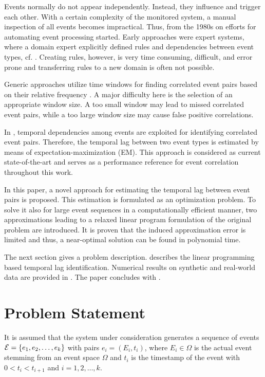 \documentclass[journal, 10pt]{IEEEtran}
\begin{document}
Events normally do not appear independently. Instead, they influence and trigger each other. With a certain complexity of the monitored system, a manual inspection of all events becomes impractical. Thus, from the 1980s on efforts for automating event processing started. Early approaches were expert systems, where a domain expert explicitly defined rules and dependencies between event types, cf. \cite{Houck1995, Kettschau2002}. 
Creating rules, however, is very time consuming, difficult, and error prone and transferring rules to a new domain is often not possible.

Generic approaches utilize time windows for finding correlated event pairs based on their relative frequency \cite{Jakobson1993, Mannila1997, Bouandas2007}. A major difficulty here is the selection of an appropriate window size. A too small window may lead to missed correlated event pairs, while a too large window size may cause false positive correlations. 

In \cite{Zeng2015}, temporal dependencies among events are exploited for identifying correlated event pairs. Therefore, the temporal lag between two event types is estimated by means of expectation-maximization (EM). This approach is considered as current state-of-the-art and serves as a performance reference for event correlation throughout this work.

In this paper, a novel approach for estimating the temporal lag between event pairs is proposed. This estimation is formulated as an optimization problem. To solve it also for large event sequences in a computationally efficient manner, two approximations leading to a relaxed linear program formulation of the original problem are introduced. It is proven that the induced approximation error is limited and thus, a near-optimal solution can be found in polynomial time. 

The next section gives a problem description.  describes the linear programming based temporal lag identification.
Numerical results on synthetic and real-world data are provided in . 
The paper concludes with .

\section{Problem Statement}
\label{sec:problem}
%
It is assumed that the system under consideration generates a sequence of events $\mathcal E = \{e_1, e_2, \ldots, e_k\}$ with pairs $e_i = (E_i, t_i)$, where $E_i \in \Omega$ is the actual event stemming from an event space $\Omega$ and $t_i$ is the timestamp of the event with $0<t_i < t_{i+1}$ and $i=1,2,\ldots,k$. %
\end{document}
